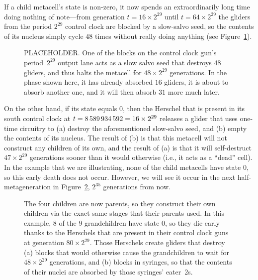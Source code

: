 If a child metacell's state is non-zero, it now spends an extraordinarily long time doing nothing of note---from generation $t = 16 \times 2^{29}$ until $t = 64 \times 2^{29}$ the gliders from the period $2^{29}$ control clock are blocked by a slow-salvo seed, so the contents of its nucleus simply cycle $48$ times without really doing anything (see Figure~\ref{fig:0e0p_timeline_17179869184}).

\begin{figure}[!htb]
	\centering
	\caption{PLACEHOLDER. One of the blocks on the control clock gun's period~$2^{29}$ output lane acts as a slow salvo seed that destroys $48$ gliders, and thus halts the metacell for $48 \times 2^{29}$ generations. In the phase shown here, it has already absorbed $16$ gliders, it is about to absorb another one, and it will then absorb $31$ more much later.}
	\label{fig:0e0p_timeline_17179869184}
\end{figure}

On the other hand, if its state equals $0$, then the Herschel that is present in its south control clock at $t = 8{\,}589{\,}934{\,}592 = 16 \times 2^{29}$ releases a glider that uses one-time circuitry to (a) destroy the aforementioned slow-salvo seed, and (b) empty the contents of its nucleus. The result of (b) is that this metacell will not construct any children of its own, and the result of (a) is that it will self-destruct $47 \times 2^{29}$ generations sooner than it would otherwise (i.e., it acts as a ``dead'' cell). In the example that we are illustrating, none of the child metacells have state $0$, so this early death does not occur. However, we will see it occur in the next half-metageneration in Figure~\ref{fig:0e0p_timeline_34359738368}, $2^{35}$ generations from now.

\begin{figure}[!htb]
	\centering
	\caption{The four children are now parents, so they construct their own children via the exact same stages that their parents used. In this example, $8$ of the $9$ grandchildren have state $0$, so they die early thanks to the Herschels that are present in their control clock guns at generation $80 \times 2^{29}$. Those Herschels create gliders that destroy (a) blocks that would otherwise cause the grandchildren to wait for $48 \times 2^{29}$ generations, and (b) blocks in syringes, so that the contents of their nuclei are absorbed by those syringes' eater~2s.}
	\label{fig:0e0p_timeline_34359738368}
\end{figure}

